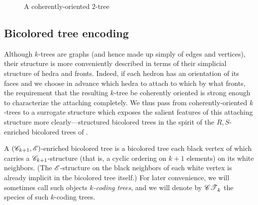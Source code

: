 \documentclass[distribution,draft]{brandiss} %
\numberwithin{section}{chapter}
\numberwithin{figure}{chapter}
\begin{document}
\begin{figure}[htb]
  \centering
  \caption{A coherently-oriented $2$-tree}
  \label{fig:exco2tree}
\end{figure}

\subsection{Bicolored tree encoding}\label{ss:bctree}
Although $k$-trees are graphs (and hence made up simply of edges and vertices), their structure is more conveniently described in terms of their simplicial structure of hedra and fronts.
Indeed, if each hedron has an orientation of its faces and we choose in advance which hedra to attach to which by what fronts, the requirement that the resulting $k$-tree be coherently oriented is strong enough to characterize the attaching completely.
We thus pass from coherently-oriented $k$-trees to a surrogate structure which exposes the salient features of this attaching structure more clearly---structured bicolored trees in the spirit of the $R, S$-enriched bicolored trees of \cite[\S 3.2]{bll:species}.

A $\left( {\mathscr{C}_{k+1}, \mathscr{E}} \right)$-enriched bicolored tree is a bicolored tree each black vertex of which carries a $\mathscr{C}_{k+1}$-structure (that is, a cyclic ordering on $k+1$ elements) on its white neighbors.
(The $\mathscr{E}$-structure on the black neighbors of each white vertex is already implicit in the bicolored tree itself.)
For later convenience, we will sometimes call such objects \emph{$k$-coding trees}, and we will denote by $\mathscr{CT}_{k}^{}$ the species of such $k$-coding trees.
\end{document}
